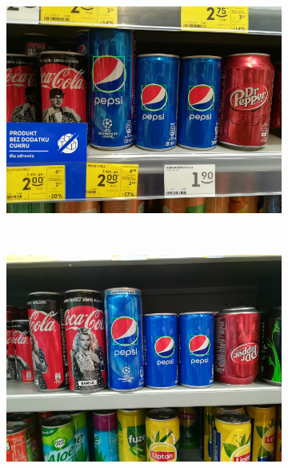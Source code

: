 \documentclass[11pt,a4paper,twoside]{report}
\begin{document}
	\begin{figure}
	    \centering
	    \begin{subfigure}[b]{0.48\textwidth}
	        \includegraphics[width=\textwidth]{img/camera/0}
	    \end{subfigure}
	    ~
	    \begin{subfigure}[b]{0.48\textwidth}
	        \includegraphics[width=\textwidth]{img/camera/10}
	    \end{subfigure}
	    \\
	    \begin{subfigure}[b]{0.48\textwidth}

\end{subfigure}
\end{figure}
\end{document}
